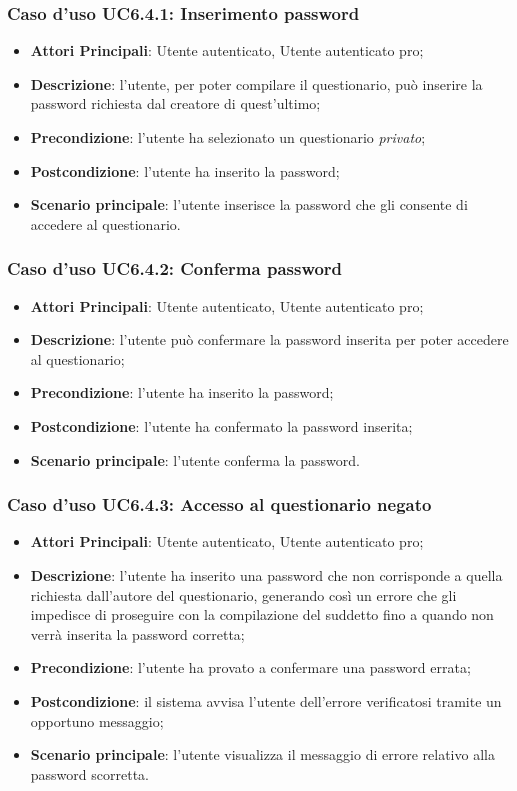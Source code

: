 \subsubsection{Caso d'uso UC6.4.1: Inserimento password}
\label{UC6.4.1}
\begin{itemize}
\item\textbf{Attori Principali}: Utente autenticato, Utente autenticato pro;
\item\textbf{Descrizione}: l'utente, per poter compilare il questionario, può inserire la password richiesta dal creatore di quest'ultimo;
\item\textbf{Precondizione}: l'utente ha selezionato un questionario \textit{privato};
\item\textbf{Postcondizione}: l'utente ha inserito la password;
\item\textbf{Scenario principale}: l'utente inserisce la password che gli consente di accedere al questionario.
\end{itemize}

\subsubsection{Caso d'uso UC6.4.2: Conferma password}
\label{UC6.4.2}
\begin{itemize}
\item\textbf{Attori Principali}: Utente autenticato, Utente autenticato pro;
\item\textbf{Descrizione}: l'utente può confermare la password inserita per poter accedere al questionario;
\item\textbf{Precondizione}: l'utente ha inserito la password;
\item\textbf{Postcondizione}: l'utente ha confermato la password inserita;
\item\textbf{Scenario principale}: l'utente conferma la password.
\end{itemize}

\subsubsection{Caso d'uso UC6.4.3: Accesso al questionario negato}
\label{UC6.4.3}
\begin{itemize}
\item\textbf{Attori Principali}: Utente autenticato, Utente autenticato pro;
\item\textbf{Descrizione}: l'utente ha inserito una password che non corrisponde a quella richiesta dall'autore del questionario, generando così un errore che gli impedisce di proseguire con la compilazione del suddetto fino a quando non verrà inserita la password corretta;
\item\textbf{Precondizione}: l'utente ha provato a confermare una password errata;
\item\textbf{Postcondizione}: il sistema avvisa l'utente dell'errore verificatosi tramite un opportuno messaggio;
\item\textbf{Scenario principale}: l'utente visualizza il messaggio di errore relativo alla password scorretta.
\end{itemize}

